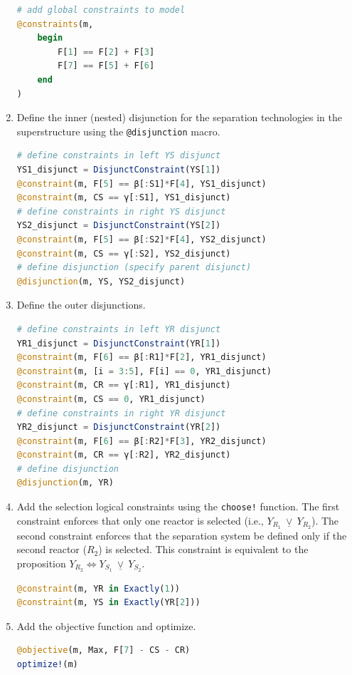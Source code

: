 \documentclass{juliacon}
\begin{document}
\begin{enumerate}
\begin{lstlisting}[language = Julia]
# add global constraints to model
@constraints(m,
    begin
        F[1] == F[2] + F[3]
        F[7] == F[5] + F[6]
    end
)
\end{lstlisting}
    \item Define the inner (nested) disjunction for the separation technologies in the superstructure using the \verb|@disjunction| macro.   
\begin{lstlisting}[language = Julia]
# define constraints in left YS disjunct
YS1_disjunct = DisjunctConstraint(YS[1])
@constraint(m, F[5] == β[:S1]*F[4], YS1_disjunct)
@constraint(m, CS == γ[:S1], YS1_disjunct)
# define constraints in right YS disjunct
YS2_disjunct = DisjunctConstraint(YS[2])
@constraint(m, F[5] == β[:S2]*F[4], YS2_disjunct)
@constraint(m, CS == γ[:S2], YS2_disjunct)
# define disjunction (specify parent disjunct)
@disjunction(m, YS, YS2_disjunct)
\end{lstlisting}
    \item Define the outer disjunctions.
\begin{lstlisting}[language = Julia]
# define constraints in left YR disjunct
YR1_disjunct = DisjunctConstraint(YR[1])
@constraint(m, F[6] == β[:R1]*F[2], YR1_disjunct)
@constraint(m, [i = 3:5], F[i] == 0, YR1_disjunct)
@constraint(m, CR == γ[:R1], YR1_disjunct)
@constraint(m, CS == 0, YR1_disjunct)
# define constraints in right YR disjunct
YR2_disjunct = DisjunctConstraint(YR[2])
@constraint(m, F[6] == β[:R2]*F[3], YR2_disjunct)
@constraint(m, CR == γ[:R2], YR2_disjunct)  
# define disjunction
@disjunction(m, YR)    
\end{lstlisting}
    \item Add the selection logical constraints using the \verb|choose!| function. The first constraint enforces that only one reactor is selected (i.e., $Y_{R_1} \ \underline{\vee} \ Y_{R_2}$). The second constraint enforces that the separation system be defined only if the second reactor ($R_2$) is selected. This constraint is equivalent to the proposition $Y_{R_2} \Leftrightarrow Y_{S_1} \ \underline{\vee} \ Y_{S_2}$.
\begin{lstlisting}[language = Julia]
@constraint(m, YR in Exactly(1))
@constraint(m, YS in Exactly(YR[2]))
\end{lstlisting}
    \item Add the objective function and optimize. 
\begin{lstlisting}[language = Julia]
@objective(m, Max, F[7] - CS - CR)
optimize!(m)
\end{lstlisting}
\end{enumerate}
\end{document}
